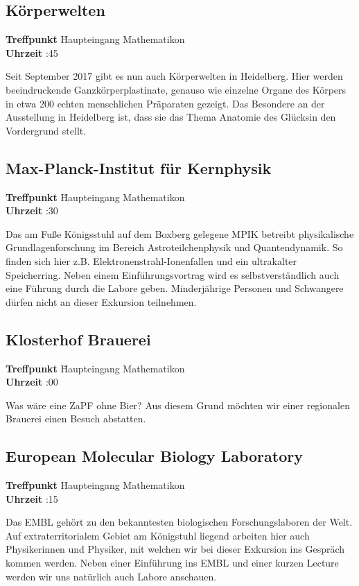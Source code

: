 \hochruecken
\subsection*{Körperwelten}
\begin{tabbing}
\textbf{Treffpunkt} \quad \quad \quad \= Haupteingang Mathematikon\\
\textbf{Uhrzeit} :45
\end{tabbing}
\hochruecken
Seit September 2017 gibt es nun auch Körperwelten in Heidelberg. Hier werden beeindruckende Ganzkörperplastinate, genauso wie einzelne Organe des Körpers in etwa 200 echten menschlichen Präparaten gezeigt. Das Besondere an der Ausstellung in Heidelberg ist, dass sie das Thema \flqq Anatomie des Glücks\frqq in den Vordergrund stellt. 

\hochruecken
\subsection*{Max-Planck-Institut für Kernphysik}
\begin{tabbing}
\textbf{Treffpunkt} \quad \quad \quad \= Haupteingang Mathematikon\\
\textbf{Uhrzeit} :30
\end{tabbing}
\hochruecken
Das am Fuße Königsstuhl auf dem Boxberg gelegene MPIK betreibt physikalische Grundlagenforschung im Bereich Astroteilchenphysik und Quantendynamik. So finden sich hier z.B. Elektronenstrahl-Ionenfallen und ein ultrakalter Speicherring. Neben einem Einführungsvortrag wird es selbstverständlich auch eine Führung durch die Labore geben. Minderjährige Personen und Schwangere dürfen nicht an dieser Exkursion teilnehmen. 

\hochruecken
\subsection*{Klosterhof Brauerei}
\begin{tabbing}
\textbf{Treffpunkt} \quad \quad \quad \= Haupteingang Mathematikon\\
\textbf{Uhrzeit} :00
\end{tabbing}
\hochruecken
Was wäre eine ZaPF ohne Bier? Aus diesem Grund möchten wir einer regionalen Brauerei einen Besuch abstatten. 

\hochruecken
\subsection*{European Molecular Biology Laboratory}
\begin{tabbing}
\textbf{Treffpunkt} \quad \quad \quad \= Haupteingang Mathematikon \\
\textbf{Uhrzeit} :15
\end{tabbing}
\hochruecken
Das EMBL gehört zu den bekanntesten biologischen Forschungslaboren der Welt. Auf extraterritorialem Gebiet am Königstuhl liegend arbeiten hier auch Physikerinnen und Physiker, mit welchen wir bei dieser Exkursion ins Gespräch kommen werden. Neben einer Einführung ins EMBL und einer kurzen \flqq Lecture \frqq werden wir uns natürlich auch Labore anschauen.

